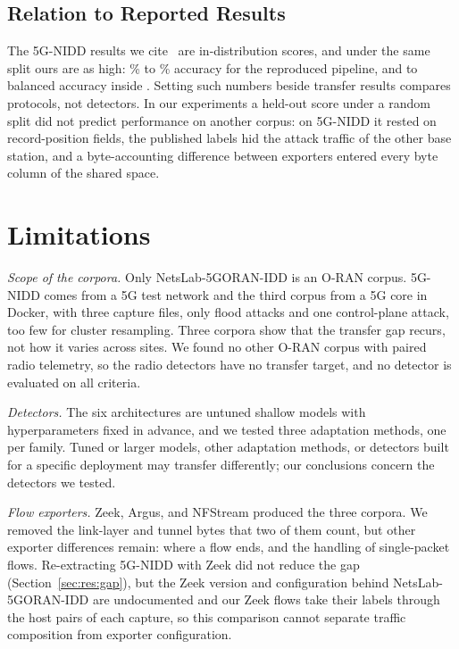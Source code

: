 \subsection{Relation to Reported Results}

The 5G-NIDD results we cite~\cite{samarakoon2022niddarxiv,siriwardhana2025descriptor,ilias2024moe5g} are in-distribution scores, and under the same split ours are as high: \PubRzAccMin\% to \PubRzAccMax\% accuracy for the reproduced pipeline, and \ThRefShRandBAmin{} to \ThRefShRandBAmax{} balanced accuracy inside \DC{}. Setting such numbers beside transfer results compares protocols, not detectors. In our experiments a held-out score under a random split did not predict performance on another corpus: on 5G-NIDD it rested on record-position fields, the published labels hid the attack traffic of the other base station, and a byte-accounting difference between exporters entered every byte column of the shared space.

\section{Limitations}
\label{sec:limitations}

\emph{Scope of the corpora.} Only NetsLab-5GORAN-IDD is an O-RAN corpus. 5G-NIDD comes from a 5G test network and the third corpus from a 5G core in Docker, with three capture files, only flood attacks and one control-plane attack, too few for cluster resampling. Three corpora show that the transfer gap recurs, not how it varies across sites. We found no other O-RAN corpus with paired radio telemetry, so the radio detectors have no transfer target, and no detector is evaluated on all criteria.

\emph{Detectors.} The six architectures are untuned shallow models with hyperparameters fixed in advance, and we tested three adaptation methods, one per family. Tuned or larger models, other adaptation methods, or detectors built for a specific deployment may transfer differently; our conclusions concern the detectors we tested.

\emph{Flow exporters.} Zeek, Argus, and NFStream produced the three corpora. We removed the link-layer and tunnel bytes that two of them count, but other exporter differences remain: where a flow ends, and the handling of single-packet flows. Re-extracting 5G-NIDD with Zeek did not reduce the gap (Section~\ref{sec:res:gap}), but the Zeek version and configuration behind NetsLab-5GORAN-IDD are undocumented and our Zeek flows take their labels through the host pairs of each capture, so this comparison cannot separate traffic composition from exporter configuration.

